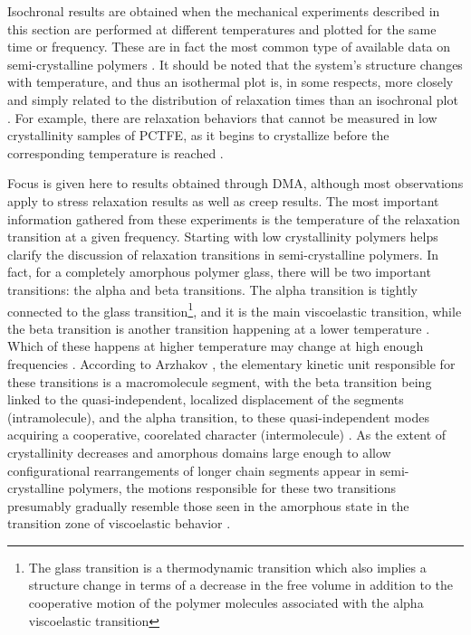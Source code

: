 Isochronal results are obtained when the mechanical experiments described in this section are performed at different temperatures and plotted for the same time or frequency.
These are in fact the most common type of available data on semi-crystalline polymers \citep{ferryViscoelasticPropertiesPolymers1980}.
It should be noted that the system's structure changes with temperature, and thus an isothermal plot is, in some respects, more closely and simply related to the distribution of relaxation times than an isochronal plot \citep{hoffmanAnalysisRelaxationsPolychlorotrifluoroethylene2007}.
For example, there are relaxation behaviors that cannot be measured in low crystallinity samples of PCTFE, as it begins to crystallize before the corresponding temperature is reached \citep{hoffmanAnalysisRelaxationsPolychlorotrifluoroethylene2007}.

Focus is given here to results obtained through DMA, although most observations apply to stress relaxation results as well as creep results.
The most important information gathered from these experiments is the temperature of the relaxation transition at a given frequency.
Starting with low crystallinity polymers helps clarify the discussion of relaxation transitions in semi-crystalline polymers.
In fact, for a completely amorphous polymer glass, there will be two important transitions: the alpha and beta transitions.
The alpha transition is tightly connected to the glass transition\footnote{The glass transition is a thermodynamic transition which also implies a structure change in terms of a decrease in the free volume in addition to the cooperative motion of the polymer molecules associated with the alpha viscoelastic transition}, and it is the main viscoelastic transition, while the beta transition is another transition happening at a lower temperature \citep{arzhakovRelaxationPhysicalMechanical2019}.
Which of these happens at higher temperature may change at high enough frequencies \citep{matsuokaThermodynamicTheoryViscoelasticity1996}.
According to Arzhakov \citep{arzhakovRelaxationPhysicalMechanical2019}, the elementary kinetic unit responsible for these transitions is a macromolecule segment, with the beta transition being linked to the quasi-independent, localized displacement of the segments (intramolecule), and the alpha transition, to these quasi-independent modes acquiring a cooperative, coorelated character (intermolecule) \citep{bershteinGeneralMechanismTransition1985, matsuokaThermodynamicTheoryViscoelasticity1996}.
As the extent of crystallinity decreases and amorphous domains large enough to allow configurational rearrangements of longer chain segments appear in semi-crystalline polymers, the motions responsible for these two transitions presumably gradually resemble those seen in the amorphous state in the transition zone of viscoelastic behavior \citep{ferryViscoelasticPropertiesPolymers1980}.

